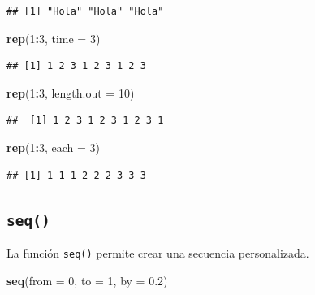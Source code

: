 \documentclass[
]{book}
\newenvironment{Shaded}{\begin{snugshade}}{\end{snugshade}}
\newcommand{\DataTypeTok}[1]{\textcolor[rgb]{0.13,0.29,0.53}{#1}}
\newcommand{\DecValTok}[1]{\textcolor[rgb]{0.00,0.00,0.81}{#1}}
\newcommand{\FloatTok}[1]{\textcolor[rgb]{0.00,0.00,0.81}{#1}}
\newcommand{\KeywordTok}[1]{\textcolor[rgb]{0.13,0.29,0.53}{\textbf{#1}}}
\newcommand{\NormalTok}[1]{#1}
\newcommand{\OperatorTok}[1]{\textcolor[rgb]{0.81,0.36,0.00}{\textbf{#1}}}
\begin{document}
\begin{verbatim}
## [1] "Hola" "Hola" "Hola"
\end{verbatim}

\begin{Shaded}
\begin{Highlighting}[]
\KeywordTok{rep}\NormalTok{(}\DecValTok{1}\OperatorTok{:}\DecValTok{3}\NormalTok{, }\DataTypeTok{time =} \DecValTok{3}\NormalTok{)}
\end{Highlighting}
\end{Shaded}

\begin{verbatim}
## [1] 1 2 3 1 2 3 1 2 3
\end{verbatim}

\begin{Shaded}
\begin{Highlighting}[]
\KeywordTok{rep}\NormalTok{(}\DecValTok{1}\OperatorTok{:}\DecValTok{3}\NormalTok{, }\DataTypeTok{length.out =} \DecValTok{10}\NormalTok{)}
\end{Highlighting}
\end{Shaded}

\begin{verbatim}
##  [1] 1 2 3 1 2 3 1 2 3 1
\end{verbatim}

\begin{Shaded}
\begin{Highlighting}[]
\KeywordTok{rep}\NormalTok{(}\DecValTok{1}\OperatorTok{:}\DecValTok{3}\NormalTok{, }\DataTypeTok{each =} \DecValTok{3}\NormalTok{)}
\end{Highlighting}
\end{Shaded}

\begin{verbatim}
## [1] 1 1 1 2 2 2 3 3 3
\end{verbatim}

\hypertarget{l015seq}{%
\subsection{\texorpdfstring{\texttt{seq()}}{seq()}}\label{l015seq}}

La función \texttt{seq()} permite crear una secuencia personalizada.

\begin{Shaded}
\begin{Highlighting}[]
\KeywordTok{seq}\NormalTok{(}\DataTypeTok{from =} \DecValTok{0}\NormalTok{, }\DataTypeTok{to =} \DecValTok{1}\NormalTok{, }\DataTypeTok{by =} \FloatTok{0.2}\NormalTok{)}
\end{Highlighting}
\end{Shaded}
\end{document}
